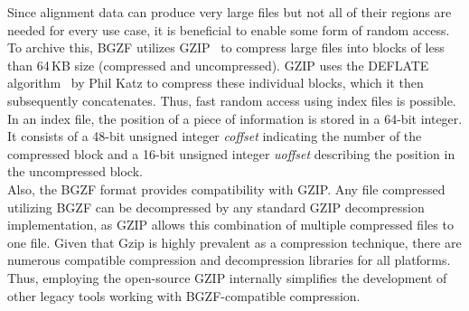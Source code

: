 Since alignment data can produce very large files but not all of their regions are needed for every use case, it is beneficial to enable some form of random access. To archive this, BGZF utilizes GZIP~\cite{gzip} to compress large files into blocks of less than 64\,KB size (compressed and uncompressed). GZIP uses the DEFLATE algorithm~\cite{deflate} by Phil Katz to compress these individual blocks, which it then subsequently concatenates. Thus, fast random access using index files is possible. In an index file, the position of a piece of information is stored in a 64-bit integer. It consists of a 48-bit unsigned integer \textit{coffset} indicating the number of the compressed block and a 16-bit unsigned integer \textit{uoffset} describing the position in the uncompressed block. \\

Also, the BGZF format provides compatibility with GZIP. Any file compressed utilizing BGZF can be decompressed by any standard GZIP decompression implementation, as GZIP allows this combination of multiple compressed files to one file. Given that Gzip is highly prevalent as a compression technique, there are numerous compatible compression and decompression libraries for all platforms. Thus, employing the open-source GZIP internally simplifies the development of other legacy tools working with BGZF-compatible compression.  \\

